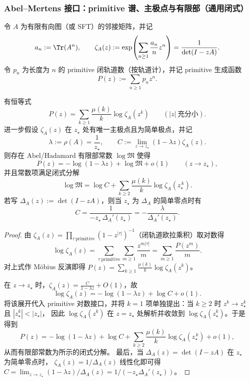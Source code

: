 \subsubsection{Abel--Mertens 接口：primitive 谱、主极点与有限部（通用闭式）}\label{app:abel-mertens-universal}
令 $A$ 为有限有向图（或 SFT）的邻接矩阵，并记
\[
a_n:=\Tr(A^n),\qquad
\zeta_A(z):=\exp\!\left(\sum_{n\ge 1}\frac{a_n}{n}z^n\right)=\frac{1}{\det(I-zA)}.
\]
令 $p_n$ 为长度为 $n$ 的 primitive 闭轨道数（按轨道计），并记 primitive 生成函数
\[
P(z):=\sum_{n\ge 1}p_n z^n.
\]

\begin{theorem}\label{thm:abel-mertens-universal}
有恒等式
\[
P(z)=\sum_{k\ge 1}\frac{\mu(k)}{k}\log\zeta_A(z^k)
\qquad(|z|\ \text{充分小}).
\]
进一步假设 $\zeta_A(z)$ 在 $z_\star$ 处有唯一主极点且为简单极点，并记
\[
\lambda:=\rho(A)=\frac{1}{z_\star},
\qquad
C:=\lim_{z\to z_\star}(1-\lambda z)\zeta_A(z).
\]
则存在 Abel/Hadamard 有限部常数 $\log\mathfrak{M}$ 使得
\[
P(z)=-\log(1-\lambda z)+\log\mathfrak{M}+o(1)\qquad(z\to z_\star),
\]
并且常数项满足闭式分解
\[
\log\mathfrak{M}
=\log C+\sum_{k\ge 2}\frac{\mu(k)}{k}\log\zeta_A(z_\star^{\,k}).
\]
若写 $\Delta_A(z):=\det(I-zA)$，则当 $z_\star$ 为 $\Delta_A$ 的简单零点时有
\[
C=\frac{1}{-z_\star\,\Delta_A'(z_\star)}=-\frac{\lambda}{\Delta_A'(z_\star)}.
\]
\end{theorem}

\begin{proof}
由 $\zeta_A(z)=\prod_{\tau\ \mathrm{primitive}}(1-z^{|\tau|})^{-1}$（闭轨道欧拉乘积）取对数得
\[
\log\zeta_A(z)=\sum_{\tau\ \mathrm{primitive}}\sum_{m\ge 1}\frac{z^{m|\tau|}}{m}
=\sum_{m\ge 1}\frac{P(z^m)}{m}.
\]
对上式作 Möbius 反演即得
\(
P(z)=\sum_{k\ge 1}\frac{\mu(k)}{k}\log\zeta_A(z^k)
\)。

在 $z\to z_\star$ 时，$\zeta_A(z)=\frac{C}{1-\lambda z}+O(1)$，故
\[
\log\zeta_A(z)=-\log(1-\lambda z)+\log C+o(1).
\]
将该展开代入 primitive 对数接口，并将 $k=1$ 项单独提出：当 $k\ge 2$ 时 $z^k\to z_\star^k$ 且 $|z_\star^k|<|z_\star|$，
因此 $\log\zeta_A(z^k)$ 在 $z=z_\star$ 处解析并收敛到 $\log\zeta_A(z_\star^k)$。于是得到
\[
P(z)=-\log(1-\lambda z)+\log C+\sum_{k\ge 2}\frac{\mu(k)}{k}\log\zeta_A(z_\star^{\,k})+o(1),
\]
从而有限部常数为所示的闭式分解。
最后，当 $\Delta_A(z)=\det(I-zA)$ 在 $z_\star$ 为简单零点时，
\(
\zeta_A(z)=1/\Delta_A(z)
\)
线性化即可得
\(
C=\lim_{z\to z_\star}(1-\lambda z)/\Delta_A(z)=1/(-z_\star\Delta_A'(z_\star))
\)。
\end{proof}


